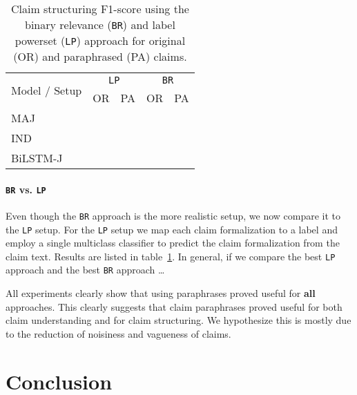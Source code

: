 \begin{table}
	\centering
	\begin{tabular}{p{3cm} c c c c }
	\toprule
		\multirow{2}{*}{Model / Setup}
		& \multicolumn{2}{c}{\texttt{LP}}
		& \multicolumn{2}{c}{\texttt{BR}}
		\\
		& OR  & PA  & OR  & PA \\
		\midrule

		MAJ & & & &  \\
		IND & & & & \\		
		BiLSTM-J & & & & \\

		\bottomrule
	\end{tabular}
	\caption{Claim structuring
	F1-score using the 
	binary relevance (\texttt{BR}) 
	and label powerset (\texttt{LP}) 
	approach for original (OR) and paraphrased (PA) claims. 
	}
	\label{tab:claim_struc_atomic_molecular}
\end{table}

\paragraph{\texttt{BR} vs. \texttt{LP} } Even though the
\texttt{BR} approach is the more realistic setup, we now compare it
to the \texttt{LP} setup. For the \texttt{LP} setup
we map each claim formalization to a label and employ a single multiclass
classifier to predict the claim formalization from the claim text.
Results are listed in table~\ref{tab:claim_struc_atomic_molecular}.
In general, if we compare the best \texttt{LP} approach and
the best \texttt{BR} approach \dots
{}

All experiments clearly show that using paraphrases proved useful for
\textbf{all} approaches. This clearly suggests that claim paraphrases
proved useful for both claim understanding and for claim structuring. 
We hypothesize this is mostly due to the reduction of noisiness and 
vagueness of claims. 


\section{Conclusion}
\label{sec:claim_struc_conclusion}

